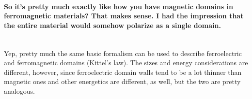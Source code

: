 \begin{changemargin}{2.5cm}{2.5cm}
\paragraph{So it's pretty much exactly like how you have magnetic domains in ferromagnetic materials? That makes sense. I had the impression that the entire material would somehow polarize as a single domain.} \mbox{}\\
\noindent Yep, pretty much the same basic formalism can be used to describe ferroelectric and ferromagnetic domains (Kittel's law). The sizes and energy considerations are different, however, since ferroelectric domain walls tend to be a lot thinner than magnetic ones and other energetics are different, as well, but the two are pretty analogous.

\end{changemargin}
